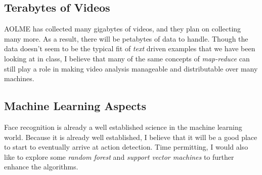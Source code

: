 \documentclass[paper=a4, fontsize=11pt]{scrartcl} %
\numberwithin{equation}{section} %
\numberwithin{figure}{section} %
\numberwithin{table}{section} %
\begin{document}
\subsection{Terabytes of Videos} 
AOLME has collected many gigabytes of videos, and they plan on collecting many more. As a result, there will be petabytes
of data to handle. Though the data doesn't seem to be the typical fit of \textit{text} driven examples that we have been
looking at in class, I believe that many of the same concepts of \textit{map-reduce} can still play a role in making video
analysis manageable and distributable over many machines. 

\subsection{Machine Learning Aspects}
Face recognition is already a well established science in the machine learning world. Because it is already well established, 
I believe that it will be a good place to start to eventually arrive at action detection. Time permitting, I would also like to 
explore some \textit{random forest} and \textit{support vector machines} to further enhance the algorithms. 
\end{document}
